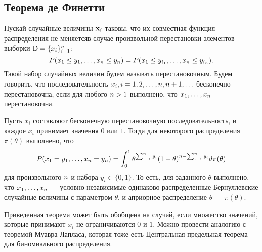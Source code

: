 \subsection{Теорема де Финетти}

Пускай случайные величины $\mathbf{x}_i$ таковы, что их совместная функция распределения не меняетсяв случае произвольной перестановки элементов выборки $\mathrm{D} = \{x_i\}_{i = 1}^{n}$:
\[
P(x_1 \leq y_1, \ldots, x_{n} \leq y_{n}) = P(x_1 \leq y_{i_1}, \ldots, x_{n} \leq y_{i_n}).
\]
Такой набор случайных величин будем называть перестановочным.
Будем говорить, что последовательность $x_i, i = 1, 2, \ldots, n, n + 1, \ldots$ бесконечно перестановочна, если для любого $n > 1$ выполнено, что $x_1, \ldots, x_{n}$ перестановочна.

\begin{Theorem}
Пусть $x_i$ составляют бесконечную перестановочную последовательность, и каждое $x_i$ принимает значения $0$ или $1$. 
Тогда для некоторого распределения $\pi(\theta)$ выполнено, что
\[
P(x_1 = y_1, \ldots, x_{n} = y_{n}) = \int_{0}^1 \theta^{\sum_{i = 1}^{n} y_i} (1 - \theta)^{n - \sum_{i = 1}^{n} y_i} d \pi(\theta)
\]
для произвольного $n$ и набора $y_i \in \{0, 1\}$.
То есть, для заданного $\theta$ выполнено, что $x_1, \ldots, x_{n}$ --- условно независимые одинаково распределенные Бернуллевские случайные величины  с параметром $\theta$, и априорное распределение $\theta$ --- $\pi(\theta)$.
\end{Theorem}

Приведенная теорема может быть обобщена на случай, если множество значений, которые принимают $x_i$ не ограничиваются $0$ и $1$.
Можно провести аналогию с теоремой Муавра-Лапласа, которая тоже есть Центральная предельная теорема для биномиального распределения.



